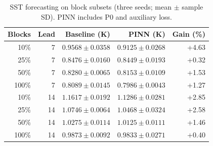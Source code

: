 \begin{table}[t]
\centering
\caption{SST forecasting on block subsets (three seeds; mean $\pm$ sample SD). PINN includes P0 and auxiliary loss.}
\label{tab:table_sst}
\small
\begin{tabular}{rrrrr}
\toprule
Blocks & Lead & Baseline (K) & PINN (K) & Gain (\%) \\
\midrule
10\% & 7 & $0.9568 \pm 0.0358$ & $0.9125 \pm 0.0268$ & +4.63 \\
25\% & 7 & $0.8476 \pm 0.0160$ & $0.8449 \pm 0.0193$ & +0.32 \\
50\% & 7 & $0.8280 \pm 0.0065$ & $0.8153 \pm 0.0109$ & +1.53 \\
100\% & 7 & $0.8089 \pm 0.0145$ & $0.7986 \pm 0.0043$ & +1.27 \\
10\% & 14 & $1.1617 \pm 0.0192$ & $1.1286 \pm 0.0281$ & +2.85 \\
25\% & 14 & $1.0746 \pm 0.0064$ & $1.0468 \pm 0.0324$ & +2.58 \\
50\% & 14 & $1.0275 \pm 0.0114$ & $1.0125 \pm 0.0111$ & +1.46 \\
100\% & 14 & $0.9873 \pm 0.0092$ & $0.9833 \pm 0.0271$ & +0.40 \\
\bottomrule
\end{tabular}
\end{table}
